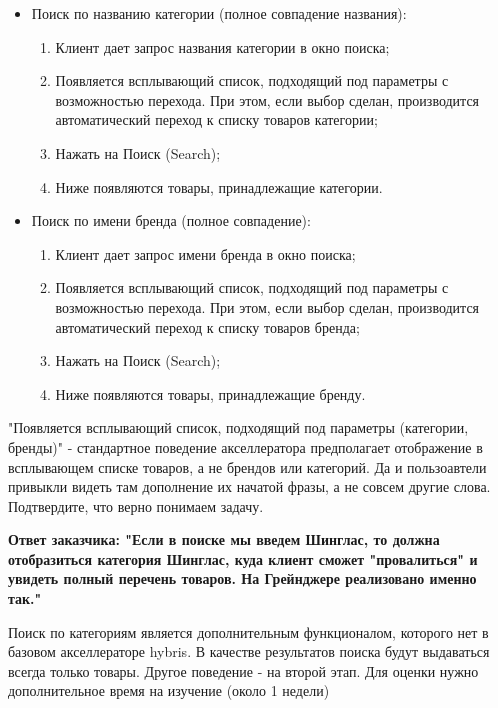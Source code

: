 {\begin{wikilong}
\begin{itemize}
\item Поиск по названию категории (полное совпадение названия):
 	\begin{enumerate} 
 		\item Клиент дает запрос названия категории в окно поиска;
		\item	Появляется всплывающий список, подходящий под параметры с возможностью перехода. При этом, если выбор сделан, производится автоматический переход к списку товаров категории;
		\item	Нажать на Поиск (Search);
		\item	Ниже появляются товары, принадлежащие категории.
	\end{enumerate}	
		
\item	Поиск по имени бренда (полное совпадение):
 	\begin{enumerate} 
		\item	Клиент дает запрос имени бренда в окно поиска;
		\item	Появляется всплывающий список, подходящий под параметры с возможностью перехода. При этом, если выбор сделан, производится автоматический переход к списку товаров бренда;
		\item	Нажать на Поиск (Search);
		\item	Ниже появляются товары, принадлежащие бренду.
	\end{enumerate}	
\end{itemize}
\end{wikilong}

\begin{teamidea}
"Появляется всплывающий список, подходящий под параметры (категории, бренды)" - стандартное поведение акселлератора предполагает отображение в всплывающем списке товаров, а не брендов или категорий. Да и пользоавтели привыкли видеть там дополнение их начатой фразы, а не совсем другие слова. Подтвердите, что верно понимаем задачу.

\textbf{Ответ заказчика: "Если в поиске мы введем Шинглас, то должна отобразиться категория Шинглас, куда клиент сможет "провалиться" и увидеть полный перечень товаров. На Грейнджере реализовано именно так."}

Поиск по категориям является дополнительным функционалом, которого нет в базовом акселлераторе hybris. В качестве результатов поиска будут выдаваться всегда только товары. Другое поведение - на второй этап. Для оценки нужно дополнительное время на изучение (около 1 недели)
\end{teamidea}

}

